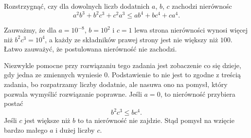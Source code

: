 \begin{problem}{5}
	Rozstrzygnąć, czy dla dowolnych liczb dodatnich $a$, $b$, $c$ zachodzi nierównośc
	\[
		a^2b^3 + b^2c^3 + c^2a^3 \leqslant ab^4 + bc^4 + ca^4.
	\]
\end{problem}

\noindent
Zauważmy, że dla $a = 10^{-8}$, $b = 10^{2}$ i  $c = 1$ lewa strona nierówności wynosi więcej niż $b^2c^3 = 10^{4}$, a każdy ze składników prawej strony jest nie większy niż $100$. Łatwo zauważyć, że postulowana nierówność nie zachodzi.

\begin{remark}
	Niezwykle pomocne przy rozwiązaniu tego zadania jest zobaczenie co się dzieje, gdy jedna ze zmiennych wyniesie $0$. Podstawienie to nie jest to zgodne z treścią zadania, bo rozpatrzamy liczby dodatnie, ale nasuwa ono na pomysł, który pozwala wymyślić rozwiązanie poprawne. Jeśli $a = 0$, to nierówność przybiera postać
	\[
		b^2c^3 \leqslant bc^4.
	\]
	Jeśli $c$ jest większe niż $b$ to ta nierówność nie zajdzie. Stąd pomysł na wzięcie bardzo małego $a$ i dużej liczby $c$.
\end{remark}
